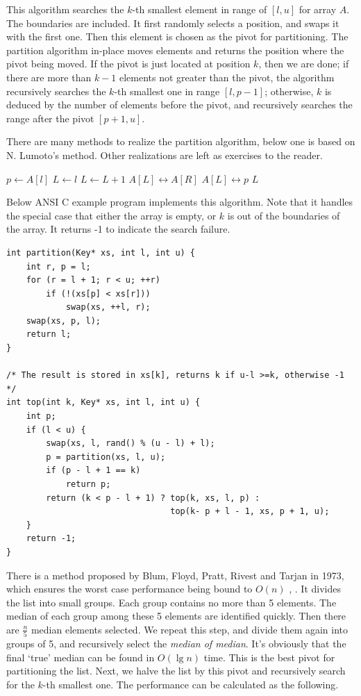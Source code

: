 \documentclass[UTF8]{article}
\begin{document}
This algorithm searches the $k$-th smallest element in range of $[l, u]$ for array $A$. The boundaries
are included. It first randomly selects a position, and swaps it with the first one. Then this element
is chosen as the pivot for partitioning. The partition algorithm in-place moves elements and
returns the position where the pivot being moved. If the pivot is just located at position $k$, then
we are done; if there are more than $k-1$ elements not greater than the pivot, the algorithm
recursively searches the $k$-th smallest one in range $[l, p-1]$; otherwise, $k$ is deduced by the
number of elements before the pivot, and recursively searches the range after the pivot $[p+1, u]$.

There are many methods to realize the partition algorithm, below one is based on N. Lumoto's method.
Other realizations are left as exercises to the reader.

\begin{algorithmic}[1]
  \State $p \gets A[l]$
  \State $L \gets l$
      \State $L \gets L + 1$
      \State {} $A[L] \leftrightarrow A[R]$
    \EndIf
  \EndFor
  \State {} $A[L] \leftrightarrow p$
  \State \Return $L$
\EndFunction
\end{algorithmic}

Below ANSI C example program implements this algorithm. Note that it handles the special case that
either the array is empty, or $k$ is out of the boundaries of the array. It returns -1 to indicate
the search failure.

\lstset{language=C}
\begin{lstlisting}
int partition(Key* xs, int l, int u) {
    int r, p = l;
    for (r = l + 1; r < u; ++r)
        if (!(xs[p] < xs[r]))
            swap(xs, ++l, r);
    swap(xs, p, l);
    return l;
}

/* The result is stored in xs[k], returns k if u-l >=k, otherwise -1 */
int top(int k, Key* xs, int l, int u) {
    int p;
    if (l < u) {
        swap(xs, l, rand() % (u - l) + l);
        p = partition(xs, l, u);
        if (p - l + 1 == k)
            return p;
        return (k < p - l + 1) ? top(k, xs, l, p) :
                                 top(k- p + l - 1, xs, p + 1, u);
    }
    return -1;
}
\end{lstlisting}

There is a method proposed by Blum, Floyd, Pratt, Rivest and Tarjan in 1973, which ensures the worst case performance
being bound to $O(n)$ \cite{CLRS}, \cite{median-of-median}. It divides the list into small groups. Each group contains
no more than 5 elements. The median of each group among these 5 elements are identified quickly. Then there are $\frac{n}{5}$
median elements selected. We repeat this step, and divide them again into groups of 5, and recursively select the
{\em median of median}. It's obviously that the final `true' median can be found in $O(\lg n)$ time. This is the
best pivot for partitioning the list. Next, we halve the list by this pivot and recursively search for the $k$-th
smallest one. The performance can be calculated as the following.
\end{document}
